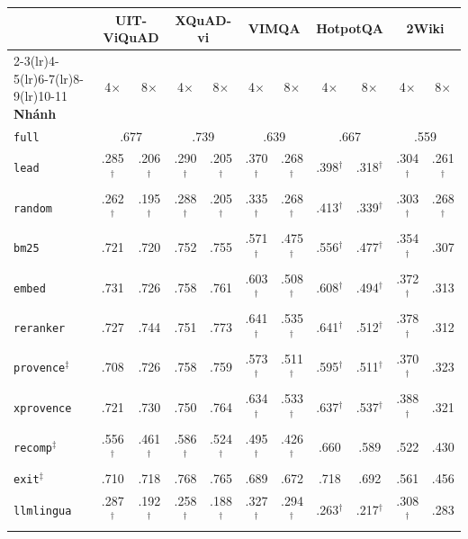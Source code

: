 \documentclass[11pt]{article}
\newcommand{\arm}[1]{\texttt{#1}}
\begin{document}
\begin{table}[t]
\centering
\small
\begin{tabular}{l cc cc cc cc cc}
\toprule
& \multicolumn{2}{c}{UIT-ViQuAD} & \multicolumn{2}{c}{XQuAD-vi} & \multicolumn{2}{c}{VIMQA} & \multicolumn{2}{c}{HotpotQA} & \multicolumn{2}{c}{2Wiki} \\
\cmidrule(lr){2-3}\cmidrule(lr){4-5}\cmidrule(lr){6-7}\cmidrule(lr){8-9}\cmidrule(lr){10-11}
\textbf{Nhánh} & 4$\times$ & 8$\times$ & 4$\times$ & 8$\times$ & 4$\times$ & 8$\times$ & 4$\times$ & 8$\times$ & 4$\times$ & 8$\times$ \\
\midrule
\arm{full} & \multicolumn{2}{c}{.677} & \multicolumn{2}{c}{.739} & \multicolumn{2}{c}{.639} & \multicolumn{2}{c}{.667} & \multicolumn{2}{c}{.559} \\
\midrule
\arm{lead} & .285$^\dagger$ & .206$^\dagger$ & .290$^\dagger$ & .205$^\dagger$ & .370$^\dagger$ & .268$^\dagger$ & .398$^\dagger$ & .318$^\dagger$ & .304$^\dagger$ & .261$^\dagger$ \\
\arm{random} & .262$^\dagger$ & .195$^\dagger$ & .288$^\dagger$ & .205$^\dagger$ & .335$^\dagger$ & .268$^\dagger$ & .413$^\dagger$ & .339$^\dagger$ & .303$^\dagger$ & .268$^\dagger$ \\
\arm{bm25} & .721 & .720 & .752 & .755 & .571$^\dagger$ & .475$^\dagger$ & .556$^\dagger$ & .477$^\dagger$ & .354$^\dagger$ & .307 \\
\arm{embed} & .731 & .726 & .758 & .761 & .603$^\dagger$ & .508$^\dagger$ & .608$^\dagger$ & .494$^\dagger$ & .372$^\dagger$ & .313 \\
\arm{reranker} & .727 & .744 & .751 & .773 & .641$^\dagger$ & .535$^\dagger$ & .641$^\dagger$ & .512$^\dagger$ & .378$^\dagger$ & .312 \\
\midrule
\arm{provence}$^\ddagger$ & .708 & .726 & .758 & .759 & .573$^\dagger$ & .511$^\dagger$ & .595$^\dagger$ & .511$^\dagger$ & .370$^\dagger$ & .323 \\
\arm{xprovence} & .721 & .730 & .750 & .764 & .634$^\dagger$ & .533$^\dagger$ & .637$^\dagger$ & .537$^\dagger$ & .388$^\dagger$ & .321 \\
\arm{recomp}$^\ddagger$ & .556$^\dagger$ & .461$^\dagger$ & .586$^\dagger$ & .524$^\dagger$ & .495$^\dagger$ & .426$^\dagger$ & .660 & .589 & .522 & .430 \\
\arm{exit}$^\ddagger$ & .710 & .718 & .768 & .765 & .689 & .672 & .718 & .692 & .561 & .456 \\
\arm{llmlingua} & .287$^\dagger$ & .192$^\dagger$ & .258$^\dagger$ & .188$^\dagger$ & .327$^\dagger$ & .294$^\dagger$ & .263$^\dagger$ & .217$^\dagger$ & .308$^\dagger$ & .283 \\

\end{tabular}
\end{table}
\end{document}
